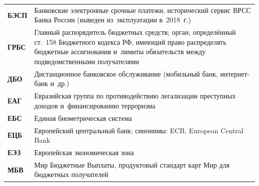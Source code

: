\begin{longtable}{@{}p{4.5em}p{\dimexpr\linewidth-4.5em-2\tabcolsep\relax}@{}}
  \textbf{БЭСП}              & Банковские электронные срочные платежи, исторический сервис ВРСС Банка России (выведен из~эксплуатации в~2018~г.)                                                                                                                                                                                \\
  \textbf{ГРБС}              & Главный распорядитель бюджетных средств; орган, определённый ст.~158 Бюджетного кодекса РФ, имеющий право распределять бюджетные ассигнования и~лимиты обязательств между подведомственными получателями                                                                                         \\
  \textbf{ДБО}               & Дистанционное банковское обслуживание (мобильный банк, интернет-банк и~др.)                                                                                                                                                                                                                      \\
  \textbf{ЕАГ}               & Евразийская группа по противодействию легализации преступных доходов и~финансированию терроризма                                                                                                                                                                                                 \\
  \textbf{ЕБС}               & Единая биометрическая система                                                                                                                                                                                                                                                                    \\
  \textbf{ЕЦБ}               & Европейский центральный банк; синонимы: ECB, European Central Bank                                                                                                                                                                                                                               \\
  \textbf{ЕЭЗ}               & Европейская экономическая зона                                                                                                                                                                                                                                                                   \\
  \textbf{МБВ}               & Мир Бюджетные Выплаты, продуктовый стандарт карт Мир для бюджетных получателей                                                                                                                                                                                                                   \\

\end{longtable}

